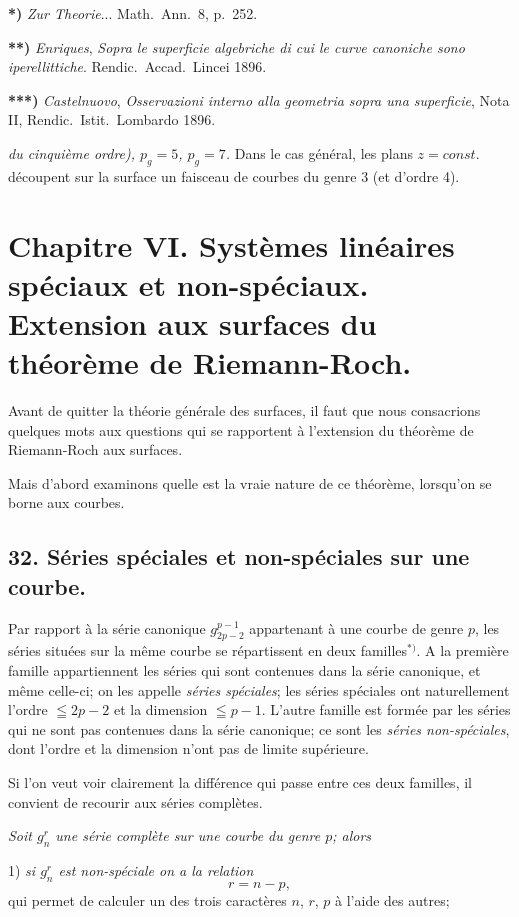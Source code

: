 \documentclass{article}
\begin{document}
\textbf{*)} \emph{Zur Theorie}... Math.\ Ann.\ 8, p.\ 252.

\textbf{**)} \emph{Enriques}, \emph{Sopra le superficie algebriche di cui le curve canoniche sono iperellittiche}. Rendic.\ Accad.\ Lincei 1896.

\textbf{***)} \emph{Castelnuovo}, \emph{Osservazioni interno alla geometria sopra una superficie}, Nota II, Rendic.\ Istit.\ Lombardo 1896.

\emph{du cinquième ordre), $p_{g} = 5$, $p_{g} = 7$.} Dans le cas général, les plans $z = const.$ découpent sur la surface un faisceau de courbes du genre 3 (et d'ordre 4).

\section*{Chapitre VI. Systèmes linéaires spéciaux et non-spéciaux. Extension aux surfaces du théorème de Riemann-Roch.}

Avant de quitter la théorie générale des surfaces, il faut que nous consacrions quelques mots aux questions qui se rapportent à l'extension du théorème de Riemann-Roch aux surfaces.

Mais d'abord examinons quelle est la vraie nature de ce théorème, lorsqu'on se borne aux courbes.

\subsection*{32. Séries spéciales et non-spéciales sur une courbe.}

Par rapport à la série canonique $g_{2p-2}^{p-1}$ appartenant à une courbe de genre $p$, les séries situées sur la même courbe se répartissent en deux familles${}^{*)}$. A la première famille appartiennent les séries qui sont contenues dans la série canonique, et même celle-ci; on les appelle \emph{séries spéciales}; les séries spéciales ont naturellement l'ordre $\leqq 2p - 2$ et la dimension $\leqq p - 1$. L'autre famille est formée par les séries qui ne sont pas contenues dans la série canonique; ce sont les \emph{séries non-spéciales}, dont l'ordre et la dimension n'ont pas de limite supérieure.

Si l'on veut voir clairement la différence qui passe entre ces deux familles, il convient de recourir aux séries complètes.

\emph{Soit $g_{n}^{r}$ une série complète sur une courbe du genre $p$; alors}

1) \emph{si $g_{n}^{r}$ est non-spéciale on a la relation}
\[ r = n - p, \]
qui permet de calculer un des trois caractères $n$, $r$, $p$ à l'aide des autres;
\end{document}
